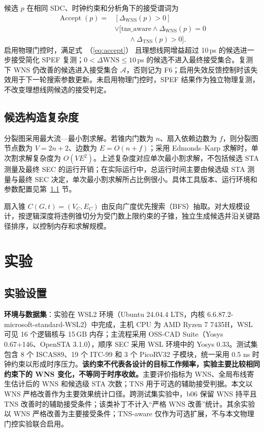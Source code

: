 \documentclass[twocolumn,10pt,fontset=windows]{ctexart}
\renewcommand{\eqref}[1]{\textup{（\ref{#1}）}}
\begin{document}
候选 $p$ 在相同 SDC、时钟约束和分析角下的接受谓词为
\begin{equation}
\label{eq:accept}
\begin{aligned}
\operatorname{Accept}(p)={}&[\Delta_{\mathrm{WNS}}(p)>0]\\
&\lor[\mathrm{tns\_aware}\land\Delta_{\mathrm{WNS}}(p)=0\\
&\qquad\land\Delta_{\mathrm{TNS}}(p)>0].
\end{aligned}
\end{equation}
启用物理门控时，满足式~\eqref{eq:accept} 且理想线网增益超过 10\,ps 的候选进一步接受简化 SPEF 复测；$0<\Delta\mathrm{WNS}\le10\,$ps 的候选不进入最终接受集合。复测下 WNS 仍改善的候选进入接受集合 $\mathcal{A}$，否则记为 F6；启用失效反馈控制时该失效用于下一轮搜索参数更新。未启用物理门控时，SPEF 结果作为独立物理复测，不改变理想线网候选的接受判定。

\subsection{候选构造复杂度}\label{sec:impl}

分裂图采用最大流—最小割求解。若锥内门数为 $n$、扇入依赖边数为 $f$，则分裂图节点数为 $V=2n+2$、边数为 $E=O(n+f)$；采用 Edmonds--Karp 求解时，单次割求解复杂度为 $O(VE^2)$。上述复杂度对应单次最小割求解，不包括候选 STA 测量及最终 SEC 的运行开销；在实际运行中，总运行时间主要由候选级 STA 测量与最终 SEC 决定，单次最小割求解所占比例很小。具体工具版本、运行环境和参数配置见第~\ref{sec:setup} 节。

扇入锥 $C(G, t) = (V_C, E_C)$ 由反向广度优先搜索（BFS）抽取。对大规模设计，按逻辑深度将违例锥切分为受门数上限约束的子锥，独立生成候选并沿关键路径排序，以控制内存和求解规模。

\section{实验}\label{sec:exp}

\subsection{实验设置}\label{sec:setup}

\textbf{环境与数据集}：实验在 WSL2 环境（Ubuntu 24.04.4 LTS，内核 6.6.87.2-microsoft-standard-WSL2）中完成，主机 CPU 为 AMD Ryzen 7 7435H，WSL 可见 16 个逻辑核与 15\,GB 内存；主流程采用 OSS-CAD Suite（Yosys 0.67+146、OpenSTA 3.1.0），顺序 SEC 采用 WSL 环境中的 Yosys 0.33。测试集包含 8 个 ISCAS89、19 个 ITC-99 和 3 个 PicoRV32 子模块，统一采用 0.5 ns 时钟约束以形成时序压力。\textbf{该约束不代表各设计的目标工作频率，实验主要比较相同约束下的 WNS 变化，不等同于时序收敛。}主要评价指标为 WNS、全局布线寄生估计后的 WNS 和候选级 STA 次数；TNS 用于可选的辅助接受判据。本文以 WNS 严格改善作为主要效果统计口径。跨测试集实验中，b06 保留 WNS 持平且 TNS 改善时的辅助接受条件；该类补丁不计入“严格 WNS 改善”统计。其余实验以 WNS 严格改善为主要接受条件；TNS-aware 仅作为可选扩展，不与本文物理门控实验联合启用。
\end{document}

